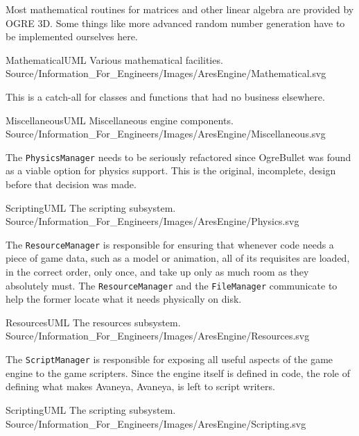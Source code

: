 \page 
{}
Most mathematical routines for matrices and other linear algebra are provided by OGRE 3D. Some things like more advanced random number generation have to be implemented ourselves here.

\FullPageLandscapeDiagram
    {MathematicalUML}
    {Various mathematical facilities.}
    {Source/Information_For_Engineers/Images/AresEngine/Mathematical.svg}

\page 
{}
This is a catch-all for classes and functions that had no business elsewhere.

\FullPageLandscapeDiagram
    {MiscellaneousUML}
    {Miscellaneous engine components.}
    {Source/Information_For_Engineers/Images/AresEngine/Miscellaneous.svg}

\page 
{}
The {\tt PhysicsManager} needs to be seriously refactored since OgreBullet was found as a viable option for physics support. This is the original, incomplete, design before that decision was made.

\FullPageLandscapeDiagram
    {ScriptingUML}
    {The scripting subsystem.}
    {Source/Information_For_Engineers/Images/AresEngine/Physics.svg}

\page 
{}
The {\tt ResourceManager} is responsible for ensuring that whenever code needs a piece of game data, such as a model or animation, all of its requisites are loaded, in the correct order, only once, and take up only as much room as they absolutely must. The {\tt ResourceManager} and the {\tt FileManager} communicate to help the former locate what it needs physically on disk.

\FullPageLandscapeDiagram
    {ResourcesUML}
    {The resources subsystem.}
    {Source/Information_For_Engineers/Images/AresEngine/Resources.svg}

\page 
{}
The {\tt ScriptManager} is responsible for exposing all useful aspects of the game engine to the game scripters. Since the engine itself is defined in code, the role of defining what makes Avaneya, Avaneya, is left to script writers.

\FullPageLandscapeDiagram
    {ScriptingUML}
    {The scripting subsystem.}
    {Source/Information_For_Engineers/Images/AresEngine/Scripting.svg}

